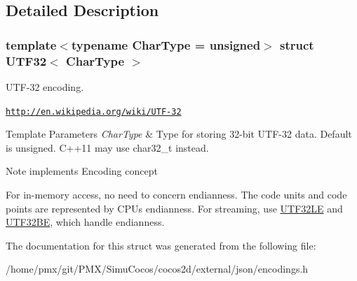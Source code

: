 \subsection{Detailed Description}
\subsubsection*{template$<$typename Char\+Type = unsigned$>$\newline
struct U\+T\+F32$<$ Char\+Type $>$}

U\+T\+F-\/32 encoding. 

\href{http://en.wikipedia.org/wiki/UTF-32}{\tt http\+://en.\+wikipedia.\+org/wiki/\+U\+T\+F-\/32} 
\begin{DoxyTemplParams}{Template Parameters}
{\em Char\+Type} & Type for storing 32-\/bit U\+T\+F-\/32 data. Default is unsigned. C++11 may use char32\+\_\+t instead. \\
\hline
\end{DoxyTemplParams}
\begin{DoxyNote}{Note}
implements Encoding concept

For in-\/memory access, no need to concern endianness. The code units and code points are represented by C\+PU\textquotesingle{}s endianness. For streaming, use \hyperlink{structUTF32LE}{U\+T\+F32\+LE} and \hyperlink{structUTF32BE}{U\+T\+F32\+BE}, which handle endianness. 
\end{DoxyNote}


The documentation for this struct was generated from the following file\+:\begin{DoxyCompactItemize}
\item 
/home/pmx/git/\+P\+M\+X/\+Simu\+Cocos/cocos2d/external/json/encodings.\+h\end{DoxyCompactItemize}
